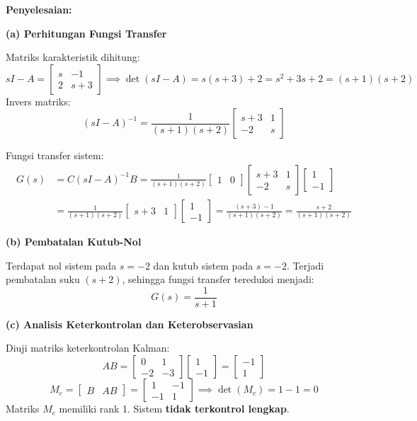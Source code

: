 \documentclass[11pt,a4paper]{article}
\begin{document}
\textbf{Penyelesaian:}

\textbf{(a) Perhitungan Fungsi Transfer}

Matriks karakteristik dihitung:
$$sI - A = \begin{bmatrix} s & -1 \\ 2 & s + 3 \end{bmatrix} \implies \det(sI - A) = s(s + 3) + 2 = s^2 + 3s + 2 = (s + 1)(s + 2)$$
Invers matriks:
$$(sI - A)^{-1} = \frac{1}{(s+1)(s+2)} \begin{bmatrix} s + 3 & 1 \\ -2 & s \end{bmatrix}$$

Fungsi transfer sistem:
\begin{align*}
    G(s) &= C(sI - A)^{-1} B = \frac{1}{(s+1)(s+2)} \begin{bmatrix} 1 & 0 \end{bmatrix} \begin{bmatrix} s + 3 & 1 \\ -2 & s \end{bmatrix} \begin{bmatrix} 1 \\ -1 \end{bmatrix} \\
    &= \frac{1}{(s+1)(s+2)} \begin{bmatrix} s + 3 & 1 \end{bmatrix} \begin{bmatrix} 1 \\ -1 \end{bmatrix} = \frac{(s + 3) - 1}{(s+1)(s+2)} = \frac{s + 2}{(s+1)(s+2)}
\end{align*}

\textbf{(b) Pembatalan Kutub-Nol}

Terdapat nol sistem pada $s = -2$ dan kutub sistem pada $s = -2$. Terjadi pembatalan suku $(s + 2)$, sehingga fungsi transfer tereduksi menjadi:
$$G(s) = \frac{1}{s + 1}$$

\textbf{(c) Analisis Keterkontrolan dan Keterobservasian}

Diuji matriks keterkontrolan Kalman:
$$AB = \begin{bmatrix} 0 & 1 \\ -2 & -3 \end{bmatrix} \begin{bmatrix} 1 \\ -1 \end{bmatrix} = \begin{bmatrix} -1 \\ 1 \end{bmatrix}$$
$$M_c = \begin{bmatrix} B & AB \end{bmatrix} = \begin{bmatrix} 1 & -1 \\ -1 & 1 \end{bmatrix} \implies \det(M_c) = 1 - 1 = 0$$
Matriks $M_c$ memiliki rank 1. Sistem \textbf{tidak terkontrol lengkap}.
\end{document}
